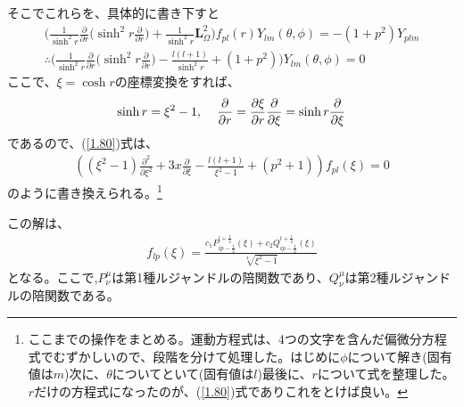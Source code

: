そこでこれらを、具体的に書き下すと
\begin{align}
\biggl(\frac{1}{\sinh^2r}\frac{\partial}{\partial r}\biggl(\sinh^2r\frac{\partial}{\partial r}\biggr)+\frac{1}{\sinh^2r}\bm{L}_{\Omega}^2\biggr)f_{pl}(r)Y_{lm}(\theta,\phi)=-(1+p^2)Y_{plm} \\
\label{1.80}
\therefore\biggl(\frac{1}{\sinh^2r}\frac{\partial}{\partial r}\biggl(\sinh^2r\frac{\partial}{\partial r}\biggr)-\frac{l(l+1)}{\sinh^2r}+(1+p^2)\biggr)Y_{lm}(\theta,\phi)=0
\end{align}
ここで、$\xi=\cosh r$の座標変換をすれば、
\begin{align}
  \sinh r=\xi^2 -1, \hspace{4mm} \frac{\partial}{\partial r}=\frac{\partial \xi}{\partial r}\frac{\partial}{\partial \xi}=\sinh r\frac{\partial}{\partial \xi}
\end{align}
であるので、(\ref{1.80})式は、
\begin{align}
  \label{1.81}
\left(\left(\xi^2-1\right)\frac{\partial^2}{\partial \xi^2}+3 x \frac{\partial}{\partial \xi}-\frac{l (l+1)}{\xi^2-1}+(p^2+1)\right)f_{pl}(\xi)=0
\end{align}
のように書き換えられる。\footnote{ここまでの操作をまとめる。運動方程式は、4つの文字を含んだ偏微分方程式でむずかしいので、段階を分けて処理した。はじめに$\phi$について解き(固有値は$m$)次に、$\theta$についてといて(固有値は$l$)最後に、$r$について式を整理した。$r$だけの方程式になったのが、(\ref{1.80})式でありこれをとけば良い。}

この解は、\begin{align}
  f_{lp}(\xi)=\frac{c_1 P_{i p-\frac{1}{2}}^{l+\frac{1}{2}}(\xi)+c_2 Q_{i p-\frac{1}{2}}^{l+\frac{1}{2}}(\xi)}{\sqrt[4]{\xi^2-1}}
\end{align}
となる。ここで,$P^{\mu}_{\nu}$は第1種ルジャンドルの陪関数であり、$Q^{\mu}_{\nu}$は第2種ルジャンドルの陪関数である。

